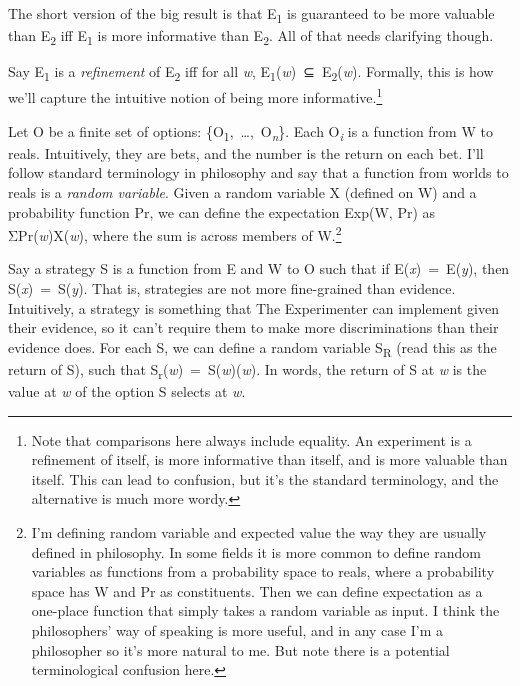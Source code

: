 \documentclass[
  10pt,
  letterpaper,
  DIV=11,
  numbers=noendperiod,
  twoside]{scrartcl}
\begin{document}
The short version of the big result is that E\textsubscript{1} is
guaranteed to be more valuable than E\textsubscript{2} iff
E\textsubscript{1} is more informative than E\textsubscript{2}. All of
that needs clarifying though.

Say E\textsubscript{1} is a \emph{refinement} of E\textsubscript{2} iff
for all \emph{w},
E\textsubscript{1}(\emph{w})~⊆~E\textsubscript{2}(\emph{w}). Formally,
this is how we'll capture the intuitive notion of being more
informative.\footnote{Note that comparisons here always include
  equality. An experiment is a refinement of itself, is more informative
  than itself, and is more valuable than itself. This can lead to
  confusion, but it's the standard terminology, and the alternative is
  much more wordy.}

Let O be a finite set of options:
\{O\textsubscript{1},~\ldots,~O\textsubscript{\emph{n}}\}. Each
O\textsubscript{\emph{i}} is a function from W to reals. Intuitively,
they are bets, and the number is the return on each bet. I'll follow
standard terminology in philosophy and say that a function from worlds
to reals is a \emph{random variable}. Given a random variable X (defined
on W) and a probability function Pr, we can define the expectation
Exp(W, Pr) as ΣPr(\emph{w})X(\emph{w}), where the sum is across members
of W.\footnote{I'm defining random variable and expected value the way
  they are usually defined in philosophy. In some fields it is more
  common to define random variables as functions from a probability
  space to reals, where a probability space has W and Pr as
  constituents. Then we can define expectation as a one-place function
  that simply takes a random variable as input. I think the
  philosophers' way of speaking is more useful, and in any case I'm a
  philosopher so it's more natural to me. But note there is a potential
  terminological confusion here.}

Say a strategy S is a function from E and W to O such that if
E(\emph{x})~=~E(\emph{y}), then S(\emph{x})~=~S(\emph{y}). That is,
strategies are not more fine-grained than evidence. Intuitively, a
strategy is something that The Experimenter can implement given their
evidence, so it can't require them to make more discriminations than
their evidence does. For each S, we can define a random variable
S\textsubscript{R} (read this as the return of S), such that
S\textsubscript{r}(\emph{w})~=~S(\emph{w})(\emph{w}). In words, the
return of S at \emph{w} is the value at \emph{w} of the option S selects
at \emph{w}.
\end{document}
